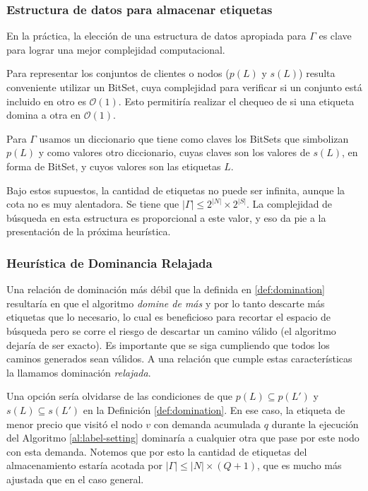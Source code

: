 \subsubsection{Estructura de datos para almacenar etiquetas}

En la práctica, la elección de una estructura de datos apropiada para $\Gamma$ es clave para lograr una mejor complejidad computacional.

Para representar los conjuntos de clientes o nodos ($p(L)$ y $s(L)$) resulta conveniente utilizar un BitSet, cuya complejidad para verificar si un conjunto está incluido en otro es $\mathcal{O}(1)$. Esto permitiría realizar el chequeo de si una etiqueta domina a otra en $\mathcal{O}(1)$. 

Para $\Gamma$ usamos un diccionario que tiene como claves los BitSets que simbolizan $p(L)$ y como valores otro diccionario, cuyas claves son los valores de $s(L)$, en forma de BitSet, y cuyos valores son las etiquetas $L$. 

Bajo estos supuestos, la cantidad de etiquetas no puede ser infinita, aunque la cota no es muy alentadora. Se tiene que $|\Gamma| \leq 2^{|N|} \times 2^{|S|}$. La complejidad de búsqueda en esta estructura es proporcional a este valor, y eso da pie a la presentación de la próxima heurística.


\subsubsection{Heurística de Dominancia Relajada}
\label{subsubsection:segment-tree-heuristic}

Una relación de dominación más débil que la definida en \ref{def:domination} resultaría en que el algoritmo \emph{domine de más} y por lo tanto descarte más etiquetas que lo necesario, lo cual es beneficioso para recortar el espacio de búsqueda pero se corre el riesgo de descartar un camino válido (el algoritmo dejaría de ser exacto). Es importante que se siga cumpliendo que todos los caminos generados sean válidos. A una relación que cumple estas características la llamamos dominación \emph{relajada}.

Una opción sería olvidarse de las condiciones de que $p(L) \subseteq p(L')$ y $s(L) \subseteq s(L')$ en la Definición \ref{def:domination}. En ese caso, la etiqueta de menor precio que visitó el nodo $v$ con demanda acumulada $q$ durante la ejecución del Algoritmo \ref{al:label-setting} dominaría a cualquier otra que pase por este nodo con esta demanda. Notemos que por esto la cantidad de etiquetas del almacenamiento estaría acotada por $|\Gamma| \leq |N| \times (Q+1)$, que es mucho más ajustada que en el caso general.

